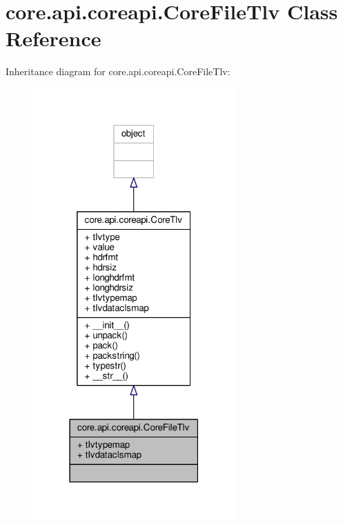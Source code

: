 \hypertarget{classcore_1_1api_1_1coreapi_1_1_core_file_tlv}{\section{core.\+api.\+coreapi.\+Core\+File\+Tlv Class Reference}
\label{classcore_1_1api_1_1coreapi_1_1_core_file_tlv}
}


Inheritance diagram for core.\+api.\+coreapi.\+Core\+File\+Tlv\+:
\nopagebreak
\begin{figure}[H]
\begin{center}
\leavevmode
\includegraphics[width=219pt]{classcore_1_1api_1_1coreapi_1_1_core_file_tlv__inherit__graph}
\end{center}
\end{figure}


